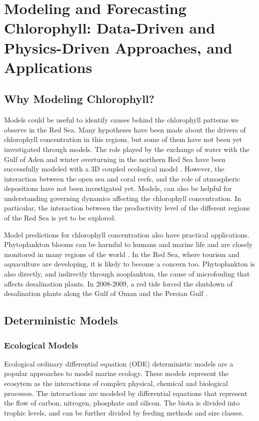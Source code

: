\section{Modeling and Forecasting Chlorophyll: Data-Driven and Physics-Driven 
Approaches, and Applications}

\subsection{Why Modeling Chlorophyll?}

Models could be useful to identify causes behind the chlorophyll patterns we 
observe in the Red Sea. Many hypotheses have been made about the drivers of 
chlorophyll concentration in this regions, but some of them have not been yet 
investigated through models. The role played by the exchange of water with the 
Gulf of Aden and winter overturning in the northern Red Sea have been 
successfully modeled with a 3D coupled ecological model 
\citep{Triantafyllou2014}. However, the interaction between the open sea and 
coral reefs, and the role of atmospheric depositions have not been investigated 
yet. Models, can also be helpful for understanding governing dynamics affecting 
the chlorophyll concentration. In particular, the interaction between the 
productivity level of the different regions of the Red Sea is yet to be 
explored.

Model predictions for chlorophyll concentration also have practical 
applications. Phytoplankton blooms can be harmful to humans and marine life and 
are closely monitored in many regions of the world \citep{Pettersson2013}. In 
the Red Sea, where tourism and aquaculture are developing, it is likely to 
become a concern too. Phytoplankton is also directly, and indirectly through 
zooplankton, the cause of microfouling that affects desalination plants. In 
2008-2009, a red tide forced the shutdown of desalination plants along the Gulf 
of Oman and the Persian Gulf \citep{Richlen2010}.


\subsection{Deterministic Models}

\subsubsection{Ecological Models}

Ecological ordinary differential equation (ODE) deterministic models are a 
popular approaches to model marine ecology. These models represent the ecosytem 
as the interactions of complex physical, chemical and biological processes. The 
interactions are modeled by differential equations that represent the flow of 
carbon, nitrogen, phosphate and silicon. The biota is divided into trophic 
levels, and can be further divided by feeding methods and size classes.

